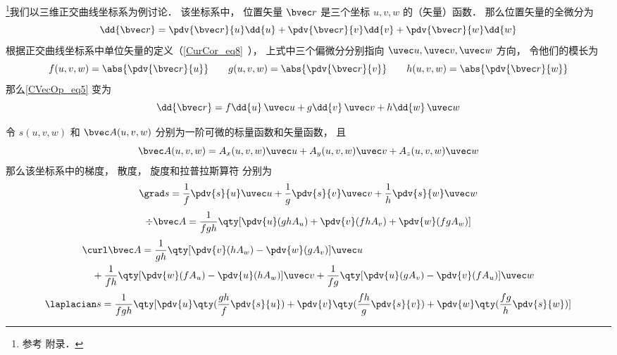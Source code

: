 

\footnote{参考 \cite{GriffE} 附录．}我们以三维正交曲线坐标系为例讨论． 该坐标系中， 位置矢量 $\bvec r$ 是三个坐标 $u, v, w$ 的（矢量）函数． 那么位置矢量的全微分为
\begin{equation}\label{CVecOp_eq5}
\dd{\bvec r} = \pdv{\bvec r}{u}\dd{u} + \pdv{\bvec r}{v}\dd{v} + \pdv{\bvec r}{w}\dd{w}
\end{equation}
根据正交曲线坐标系中单位矢量的定义（\autoref{CurCor_eq8}~）， 上式中三个偏微分分别指向 $\uvec u, \uvec v, \uvec w$ 方向， 令他们的模长为
\begin{equation}
f(u,v,w) = \abs{\pdv{\bvec r}{u}} \qquad
g(u,v,w) = \abs{\pdv{\bvec r}{v}} \qquad
h(u,v,w) = \abs{\pdv{\bvec r}{w}}
\end{equation}
那么\autoref{CVecOp_eq5} 变为
\begin{equation}\label{CVecOp_eq4}
\dd{\bvec r} = f\dd{u}\,\uvec u + g\dd{v}\,\uvec v + h\dd{w}\,\uvec w
\end{equation}


令 $s(u, v, w)$ 和 $\bvec A(u, v, w)$ 分别为一阶可微的标量函数和矢量函数， 且
\begin{equation}\label{CVecOp_eq7}
\bvec A(u, v, w) = A_x(u, v, w)\uvec u + A_y(u, v, w)\uvec v + A_z(u, v, w)\uvec w
\end{equation}
那么该坐标系中的梯度， 散度， 旋度和拉普拉斯算符 分别为
\begin{equation}\label{CVecOp_eq1}
\grad s = \frac{1}{f} \pdv{s}{u}\uvec u + \frac{1}{g}\pdv{s}{v} \uvec v + \frac{1}{h} \pdv{s}{w}\uvec w
\end{equation}
\begin{equation}\label{CVecOp_eq2}
\div \bvec A = \frac{1}{fgh}\qty[\pdv{u}(ghA_u) + \pdv{v}(fhA_v) + \pdv{w}(fgA_w)]
\end{equation}
\begin{equation}\label{CVecOp_eq3}
\begin{aligned}
&\curl \bvec A = \frac{1}{gh}\qty[\pdv{v}(hA_w) - \pdv{w}(gA_v)]\uvec u\\
&\quad + \frac{1}{fh}\qty[\pdv{w}(fA_u) - \pdv{u}(hA_w)]\uvec v
+ \frac{1}{fg}\qty[\pdv{u}(gA_v) - \pdv{v}(fA_u)]\uvec w
\end{aligned}
\end{equation}
\begin{equation}\label{CVecOp_eq6}
\laplacian s = \frac{1}{fgh}\qty[\pdv{u}\qty(\frac{gh}{f}\pdv{s}{u}) + \pdv{v}\qty(\frac{fh}{g}\pdv{s}{v}) + \pdv{w}\qty(\frac{fg}{h}\pdv{s}{w})]
\end{equation}

